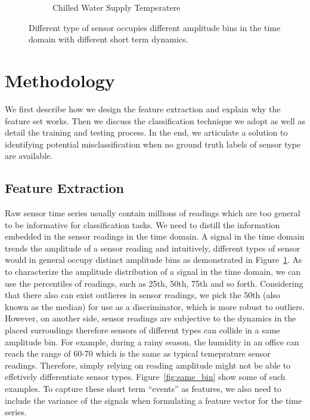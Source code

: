 \begin{figure}[ht!]
\begin{subfigure}{0.32\textwidth}
                \caption{Chilled Water Supply Temperatere}
  \end{subfigure}
\caption{Different type of sensor occupies different amplitude bins in the time domain with different short term dynamics.}
\label{fig:example}
\end{figure}

\section{Methodology}
We first describe how we design the feature extraction and explain why the feature set works. Then we discuss
the classification technique we adopt as well as detail the training and testing process. In the end, we articulate
a solution to identifying potential misclassification when no ground truth labels of sensor type are available.

\subsection{Feature Extraction}
Raw sensor time series usually contain millions of readings which are too general to be informative for classification
tasks. We need to distill the information embedded in the sensor readings in the time domain. A signal in the time domain
trends the amplitude of a sensor reading and intuitively, different types of sensor would in general occupy distinct
amplitude bins as demonstrated in Figure~\ref{fig:example}. As to characterize the amplitude distribution of a signal in the time
domain, we can use the percentiles of readings, such as 25th, 50th, 75th and so forth. Considering that there also can
exist outlieres in sensor readings, we pick the 50th (also known as the median) for use as a discriminator, which
is more robust to outliers. However, on another side, sensor readings are subjective to the dynamics in the placed
surroudings therefore sensors of different types can collide in a same amplitude bin. For example, during a rainy season, the humidity in an
office can reach the range of 60-70 which is the same as typical temeprature sensor readings. Therefore, simply relying
on reading amplitude might not be able to effetively differentiate sensor types. Figure~\ref{fig:same_bin} show some of such
examples. To capture these short term ``events'' as features, we also need to include the variance of the signals when
formulating a feature vector for the time series.

